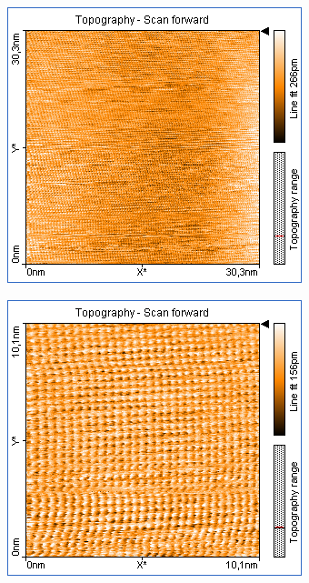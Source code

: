 \begin{figure}
\begin{subfigure}[b]{\picwidth}
        \caption{}
        \label{fig:graphit_06_02}
    \end{subfigure}
    \begin{subfigure}[b]{\picwidth}
        \includegraphics[width=\textwidth]{data/Graphit/pic_06_03_30nm}
        \caption{}
        \label{fig:graphit_06_03}
    \end{subfigure}\qquad
    \begin{subfigure}[b]{\picwidth}
        \includegraphics[width=\textwidth]{data/Graphit/pic_06_04_10nm}

\end{subfigure}
\end{figure}

